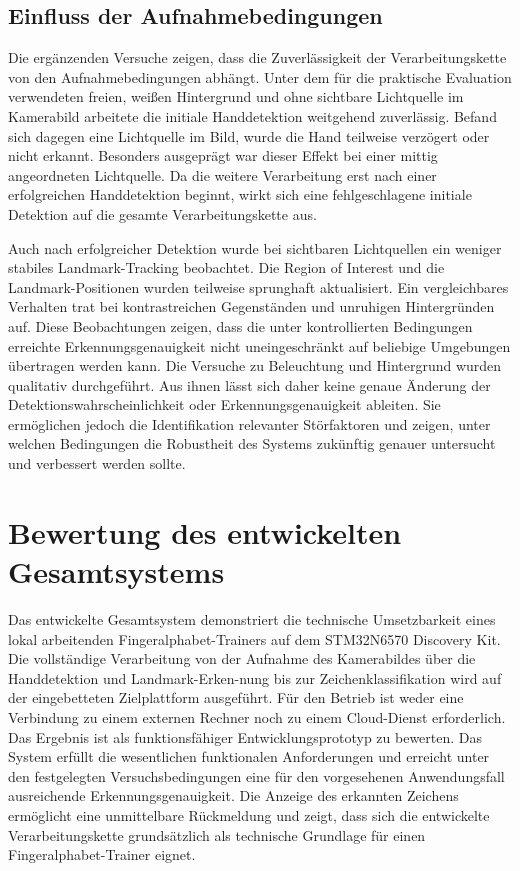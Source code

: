 \subsection{Einfluss der Aufnahmebedingungen}

Die ergänzenden Versuche zeigen, dass die Zuverlässigkeit der Verarbeitungskette von den Aufnahmebedingungen abhängt. Unter dem für die praktische Evaluation verwendeten freien, weißen Hintergrund und ohne sichtbare Lichtquelle im Kamerabild arbeitete die initiale Handdetektion weitgehend zuverlässig. Befand sich dagegen eine Lichtquelle im Bild, wurde die Hand teilweise verzögert oder nicht erkannt. Besonders ausgeprägt war dieser Effekt bei einer mittig angeordneten Lichtquelle. Da die weitere Verarbeitung erst nach einer erfolgreichen Handdetektion beginnt, wirkt sich eine fehlgeschlagene initiale Detektion auf die gesamte Verarbeitungskette aus.

Auch nach erfolgreicher Detektion wurde bei sichtbaren Lichtquellen ein weniger stabiles Landmark-Tracking beobachtet. Die Region of Interest und die Landmark-Positionen wurden teilweise sprunghaft aktualisiert. Ein vergleichbares Verhalten trat bei kontrastreichen Gegenständen und unruhigen Hintergründen auf. Diese Beobachtungen zeigen, dass die unter kontrollierten Bedingungen erreichte Erkennungsgenauigkeit nicht uneingeschränkt auf beliebige Umgebungen übertragen werden kann. Die Versuche zu Beleuchtung und Hintergrund wurden qualitativ durchgeführt. Aus ihnen lässt sich daher keine genaue Änderung der Detektionswahrscheinlichkeit oder Erkennungsgenauigkeit ableiten. Sie ermöglichen jedoch die Identifikation relevanter Störfaktoren und zeigen, unter welchen Bedingungen die Robustheit des Systems zukünftig genauer untersucht und verbessert werden sollte.

\section{Bewertung des entwickelten Gesamtsystems}

Das entwickelte Gesamtsystem demonstriert die technische Umsetzbarkeit eines lokal arbeitenden Fingeralphabet-Trainers auf dem STM32N6570 Discovery Kit. Die vollständige Verarbeitung von der Aufnahme des Kamerabildes über die Handdetektion und Landmark-Erken-nung bis zur Zeichenklassifikation wird auf der eingebetteten Zielplattform ausgeführt. Für den Betrieb ist weder eine Verbindung zu einem externen Rechner noch zu einem Cloud-Dienst erforderlich. Das Ergebnis ist als funktionsfähiger Entwicklungsprototyp zu bewerten. Das System erfüllt die wesentlichen funktionalen Anforderungen und erreicht unter den festgelegten Versuchsbedingungen eine für den vorgesehenen Anwendungsfall ausreichende Erkennungsgenauigkeit. Die Anzeige des erkannten Zeichens ermöglicht eine unmittelbare Rückmeldung und zeigt, dass sich die entwickelte Verarbeitungskette grundsätzlich als technische Grundlage für einen Fingeralphabet-Trainer eignet.

